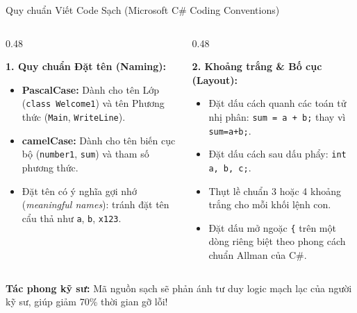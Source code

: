\documentclass[aspectratio=169, 10pt]{beamer}
\begin{document}
\begin{frame}{Quy chuẩn Viết Code Sạch (Microsoft C\# Coding Conventions)}
  \begin{columns}[T]
    \begin{column}{0.48\textwidth}
      \begin{block}{\textbf{1. Quy chuẩn Đặt tên (Naming):}}
        \begin{itemize}\small
          \item \textbf{PascalCase:} Dành cho tên Lớp (\texttt{class Welcome1}) và tên Phương thức (\texttt{Main}, \texttt{WriteLine}).
          \item \textbf{camelCase:} Dành cho tên biến cục bộ (\texttt{number1}, \texttt{sum}) và tham số phương thức.
          \item Đặt tên có ý nghĩa gợi nhớ (\textit{meaningful names}): tránh đặt tên cẩu thả như \texttt{a}, \texttt{b}, \texttt{x123}.
        \end{itemize}
      \end{block}
    \end{column}

    \begin{column}{0.48\textwidth}
      \begin{block}{\textbf{2. Khoảng trắng \& Bố cục (Layout):}}
        \begin{itemize}\small
          \item Đặt dấu cách quanh các toán tử nhị phân: \texttt{sum = a + b;} thay vì \texttt{sum=a+b;}.
          \item Đặt dấu cách sau dấu phẩy: \texttt{int a, b, c;}.
          \item Thụt lề chuẩn 3 hoặc 4 khoảng trắng cho mỗi khối lệnh con.
          \item Đặt dấu mở ngoặc \texttt{\{} trên một dòng riêng biệt theo phong cách chuẩn Allman của C\#.
        \end{itemize}
      \end{block}
    \end{column}
  \end{columns}
  \vspace{2mm}
  \begin{alertblock}{\textbf{Tác phong kỹ sư:}}
    Mã nguồn sạch sẽ phản ánh tư duy logic mạch lạc của người kỹ sư, giúp giảm 70\% thời gian gỡ lỗi!
  \end{alertblock}
\end{frame}
\end{document}
